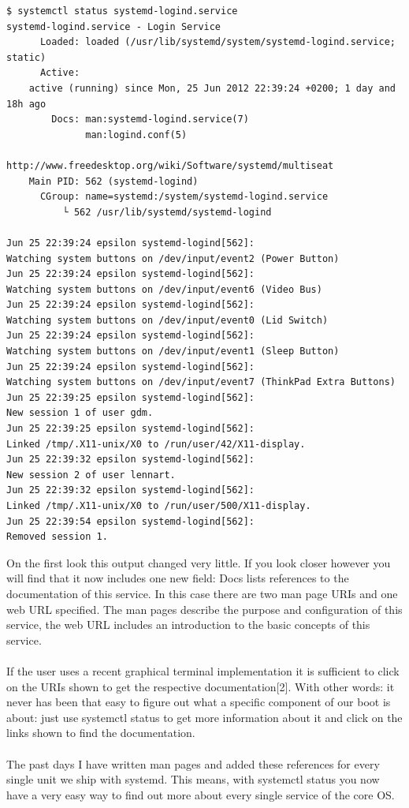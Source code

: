 \documentclass[titlepage]{article}
\begin{document}
\begin{lstlisting}
$ systemctl status systemd-logind.service
systemd-logind.service - Login Service
      Loaded: loaded (/usr/lib/systemd/system/systemd-logind.service; static)
      Active: 
    active (running) since Mon, 25 Jun 2012 22:39:24 +0200; 1 day and 18h ago
        Docs: man:systemd-logind.service(7)
              man:logind.conf(5)
              http://www.freedesktop.org/wiki/Software/systemd/multiseat
    Main PID: 562 (systemd-logind)
      CGroup: name=systemd:/system/systemd-logind.service
          └ 562 /usr/lib/systemd/systemd-logind

Jun 25 22:39:24 epsilon systemd-logind[562]: 
Watching system buttons on /dev/input/event2 (Power Button)
Jun 25 22:39:24 epsilon systemd-logind[562]: 
Watching system buttons on /dev/input/event6 (Video Bus)
Jun 25 22:39:24 epsilon systemd-logind[562]: 
Watching system buttons on /dev/input/event0 (Lid Switch)
Jun 25 22:39:24 epsilon systemd-logind[562]: 
Watching system buttons on /dev/input/event1 (Sleep Button)
Jun 25 22:39:24 epsilon systemd-logind[562]: 
Watching system buttons on /dev/input/event7 (ThinkPad Extra Buttons)
Jun 25 22:39:25 epsilon systemd-logind[562]: 
New session 1 of user gdm.
Jun 25 22:39:25 epsilon systemd-logind[562]: 
Linked /tmp/.X11-unix/X0 to /run/user/42/X11-display.
Jun 25 22:39:32 epsilon systemd-logind[562]: 
New session 2 of user lennart.
Jun 25 22:39:32 epsilon systemd-logind[562]: 
Linked /tmp/.X11-unix/X0 to /run/user/500/X11-display.
Jun 25 22:39:54 epsilon systemd-logind[562]: 
Removed session 1.
\end{lstlisting}
On the first look this output changed very little. If you look closer however you will find that it now includes one new field: Docs lists references to the documentation of this service. In this case there are two man page URIs and one web URL specified. The man pages describe the purpose and configuration of this service, the web URL includes an introduction to the basic concepts of this service.
\\
\\
If the user uses a recent graphical terminal implementation it is sufficient to click on the URIs shown to get the respective documentation[2]. With other words: it never has been that easy to figure out what a specific component of our boot is about: just use systemctl status to get more information about it and click on the links shown to find the documentation.
\\
\\
The past days I have written man pages and added these references for every single unit we ship with systemd. This means, with systemctl status you now have a very easy way to find out more about every single service of the core OS.
\end{document}
